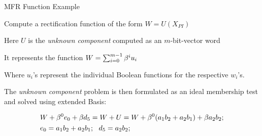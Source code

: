 \begin{frame}{\large MFR Function Example}
\bi
	\item Compute a rectification function of the form $W = U(X_{PI})$ 
	\bi
		\item Here $U$ is the \textit{unknown component} computed as an $m$-bit-vector word
		\item It represents the function $W = \sum_{i=0}^{m-1}\beta^iu_i$ 
		\bi
			\item Where $u_i$'s represent the individual Boolean functions for the respective $w_i$'s.
		\ei
	\ei
	\pause
	\item The \textit{unknown component} problem is then formulated as an ideal membership test and
	solved using extended \Grobner Basis: 
	\begin{center}
		\begin{align*}
		&W + \beta^0 e_0 + \beta d_5  = W + U = W +\beta^0(a_1b_2+a_2b_1)+\beta a_2b_2;\\
		&e_0 = a_1b_2+a_2b_1;~~d_5 = a_2b_2;
		\end{align*}
	\end{center}
\ei
\end{frame}




